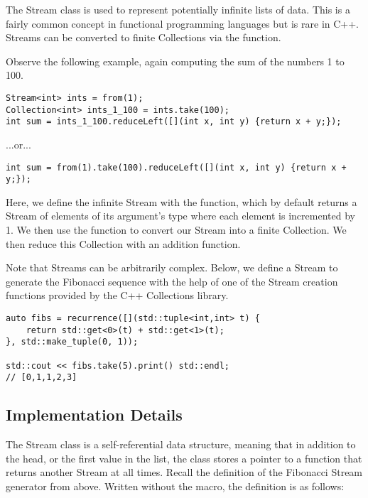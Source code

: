 
The Stream class is used to represent potentially infinite lists of data.
This is a fairly common concept in functional programming languages but is rare in C++.
Streams can be converted to finite Collections via the  function.

Observe the following example, again computing the sum of the numbers 1 to 100.

\begin{lstlisting}
Stream<int> ints = from(1);
Collection<int> ints_1_100 = ints.take(100);
int sum = ints_1_100.reduceLeft([](int x, int y) {return x + y;});
\end{lstlisting}

...or...

\begin{lstlisting}
int sum = from(1).take(100).reduceLeft([](int x, int y) {return x + y;});
\end{lstlisting}

Here, we define the infinite Stream with the  function, which by default returns a Stream of elements of its argument's type where each element is incremented by 1.
We then use the  function to convert our Stream into a finite Collection.
We then reduce this Collection with an addition function.

Note that Streams can be arbitrarily complex.
Below, we define a Stream to generate the Fibonacci sequence with the help of one of the Stream creation functions provided by the C++ Collections library.


\begin{lstlisting}
auto fibs = recurrence([](std::tuple<int,int> t) {
    return std::get<0>(t) + std::get<1>(t);
}, std::make_tuple(0, 1));

std::cout << fibs.take(5).print() std::endl;
// [0,1,1,2,3]
\end{lstlisting}





\subsection{Implementation Details}

The Stream class is a self-referential data structure, meaning that in addition to the head, or the first value in the list, the class stores a pointer to a function that returns another Stream at all times.
Recall the definition of the Fibonacci Stream generator from above.
Written without the macro, the definition is as follows:

